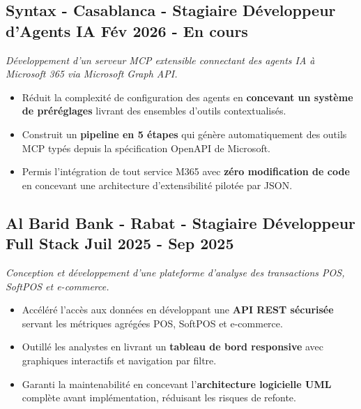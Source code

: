 \documentclass[10pt, letterpaper]{article}
\newenvironment{highlights}{
    \begin{itemize}[
        topsep=0.05cm,
        partopsep=0pt,
        itemsep=0.05cm,
        parsep=0pt,
        leftmargin=0.5cm
    ]
}{
    \end{itemize}
}
\begin{document}
\subsection{Syntax - Casablanca - Stagiaire Développeur d'Agents IA \hfill Fév 2026 - En cours}
\vspace{-1pt}
\textit{Développement d'un serveur MCP extensible connectant des agents IA à Microsoft 365 via Microsoft Graph API.}
\begin{highlights}
	\item Réduit la complexité de configuration des agents en \textbf{concevant un système de préréglages} livrant des ensembles d'outils contextualisés.
	\item Construit un \textbf{pipeline en 5 étapes} qui génère automatiquement des outils MCP typés depuis la spécification OpenAPI de Microsoft.
	\item Permis l'intégration de tout service M365 avec \textbf{zéro modification de code} en concevant une architecture d'extensibilité pilotée par JSON.
\end{highlights}

\subsection{Al Barid Bank - Rabat - Stagiaire Développeur Full Stack \hfill Juil 2025 - Sep 2025}
\vspace{-1pt}
\textit{Conception et développement d'une plateforme d'analyse des transactions POS, SoftPOS et e-commerce.}
\begin{highlights}
	\item Accéléré l'accès aux données en développant une \textbf{API REST sécurisée} servant les métriques agrégées POS, SoftPOS et e-commerce.
	\item Outillé les analystes en livrant un \textbf{tableau de bord responsive} avec graphiques interactifs et navigation par filtre.
	\item Garanti la maintenabilité en concevant l'\textbf{architecture logicielle UML} complète avant implémentation, réduisant les risques de refonte.
\end{highlights}
\end{document}
